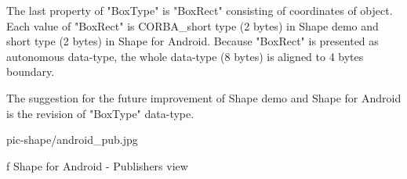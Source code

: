 The last property of "BoxType" is "BoxRect" consisting of coordinates of object. Each value of "BoxRect" is CORBA\_short type (2 bytes) in Shape demo and short type (2 bytes) in Shape for Android. Because "BoxRect" is presented as  autonomous data-type, the whole data-type (8 bytes) is aligned to 4 bytes boundary.

The suggestion for the future improvement of Shape demo and Shape for Android is the revision of "BoxType" data-type.

\midinsert {}
\picw=14cm \cinspic pic-shape/android_pub.jpg
\caption/f Shape for Android - Publishers view
\endinsert

